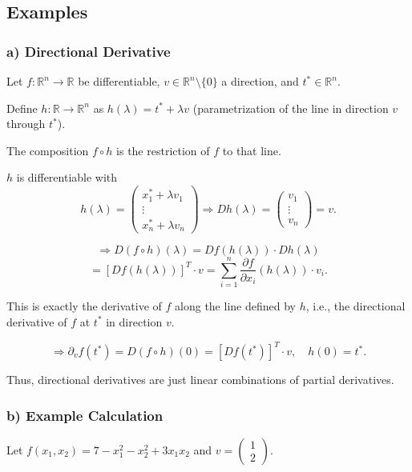 \documentclass{article}
\begin{document}
\subsection*{Examples}

\subsubsection*{a) Directional Derivative}

Let \( f : \mathbb{R}^n \to \mathbb{R} \) be differentiable, \( v \in \mathbb{R}^n \setminus \{0\} \) a direction, and \( t^* \in \mathbb{R}^n \).  

Define \( h : \mathbb{R} \to \mathbb{R}^n \) as \( h(\lambda) = t^* + \lambda v \) (parametrization of the line in direction \( v \) through \( t^* \)).  

The composition \( f \circ h \) is the restriction of \( f \) to that line.  

\( h \) is differentiable with
\[
h(\lambda) = 
\begin{pmatrix}
x_1^* + \lambda v_1 \\
\vdots \\
x_n^* + \lambda v_n
\end{pmatrix} 
\Rightarrow Dh(\lambda) = 
\begin{pmatrix}
v_1 \\
\vdots \\
v_n
\end{pmatrix} 
= v.
\]

\[
\Rightarrow D(f \circ h)(\lambda) = Df(h(\lambda)) \cdot Dh(\lambda)
\]
\[
= [Df(h(\lambda))]^T \cdot v = \sum_{i=1}^n \frac{\partial f}{\partial x_i} (h(\lambda)) \cdot v_i.
\]

This is exactly the derivative of \( f \) along the line defined by \( h \), i.e., the directional derivative of \( f \) at \( t^* \) in direction \( v \).

\[
\Rightarrow \partial_v f(t^*) = D(f \circ h)(0) = [Df(t^*)]^T \cdot v, \quad h(0) = t^*.
\]

Thus, directional derivatives are just linear combinations of partial derivatives.

\subsubsection*{b) Example Calculation}

Let \( f(x_1, x_2) = 7 - x_1^2 - x_2^2 + 3x_1x_2 \) and \( v = \begin{pmatrix} 1 \\ 2 \end{pmatrix} \).
\end{document}
